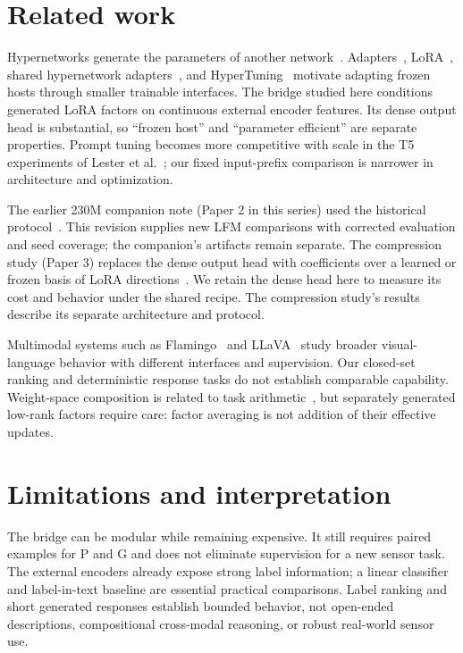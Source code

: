 \documentclass[11pt]{article}
\begin{document}
\section{Related work}
Hypernetworks generate the parameters of another network~\cite{ha2016hypernetworks}.
Adapters~\cite{houlsby2019adapters}, LoRA~\cite{hu2021lora}, shared
hypernetwork adapters~\cite{mahabadi2021hyperformer}, and
HyperTuning~\cite{phang2022hypertuning} motivate adapting frozen hosts through
smaller trainable interfaces. The bridge studied here conditions generated
LoRA factors on continuous external encoder features. Its dense output head
is substantial, so ``frozen host'' and ``parameter efficient'' are separate
properties. Prompt tuning becomes more competitive with scale in the T5
experiments of Lester et al.~\cite{lester2021power}; our fixed input-prefix
comparison is narrower in architecture and optimization.

The earlier 230M companion note (Paper 2 in this series) used the historical
protocol~\cite{penov2026bridges230m}. This revision supplies new LFM comparisons
with corrected evaluation and seed coverage; the companion's artifacts remain
separate. The compression study (Paper 3) replaces the dense output head with
coefficients over a learned or frozen basis of LoRA
directions~\cite{penov2026compressed}. We retain the dense head here to measure
its cost and behavior under the shared recipe. The compression study's results
describe its separate architecture and protocol.

Multimodal systems such as Flamingo~\cite{alayrac2022flamingo} and
LLaVA~\cite{liu2023llava} study broader visual-language behavior with different
interfaces and supervision. Our closed-set ranking and deterministic response
tasks do not establish comparable capability. Weight-space composition is
related to task arithmetic~\cite{ilharco2023task}, but separately generated
low-rank factors require care: factor averaging is not addition of their
effective updates.

\section{Limitations and interpretation}
The bridge can be modular while remaining expensive. It still requires paired
examples for P and G and does not eliminate supervision for a new sensor task.
The external encoders already expose strong label information; a linear
classifier and label-in-text baseline are essential practical comparisons.
Label ranking and short generated responses establish bounded behavior, not
open-ended descriptions, compositional cross-modal reasoning, or robust
real-world sensor use.
\end{document}
